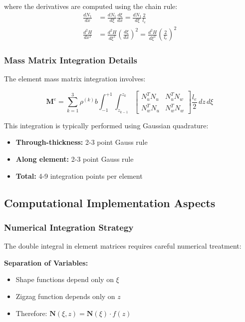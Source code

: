 \documentclass[12pt,a4paper]{article}
\begin{document}
where the derivatives are computed using the chain rule:
\begin{align}
\frac{dN_1}{dx} &= \frac{dN_1}{d\xi}\frac{d\xi}{dx} = \frac{dN_1}{d\xi}\frac{2}{l_e} \\
\frac{d^2H}{dx^2} &= \frac{d^2H}{d\xi^2}\left(\frac{d\xi}{dx}\right)^2 = \frac{d^2H}{d\xi^2}\left(\frac{2}{l_e}\right)^2
\end{align}

\subsubsection{Mass Matrix Integration Details}

The element mass matrix integration involves:

\begin{equation}
\mathbf{M}^e = \sum_{k=1}^{3} \rho^{(k)} b \int_{-1}^{+1} \int_{z_{k-1}}^{z_k}
\begin{bmatrix}
N_u^T N_u & N_u^T N_w \\
N_w^T N_u & N_w^T N_w
\end{bmatrix}
\frac{l_e}{2} \, dz \, d\xi
\end{equation}

This integration is typically performed using Gaussian quadrature:
\begin{itemize}
\item \textbf{Through-thickness:} 2-3 point Gauss rule
\item \textbf{Along element:} 2-3 point Gauss rule
\item \textbf{Total:} 4-9 integration points per element
\end{itemize}

\subsection{Computational Implementation Aspects}

\subsubsection{Numerical Integration Strategy}

The double integral in element matrices requires careful numerical treatment:

\textbf{Separation of Variables:}
\begin{itemize}
\item Shape functions depend only on $\xi$
\item Zigzag function depends only on $z$
\item Therefore: $\mathbf{N}(\xi,z) = \mathbf{N}(\xi) \cdot f(z)$
\end{itemize}
\end{document}
